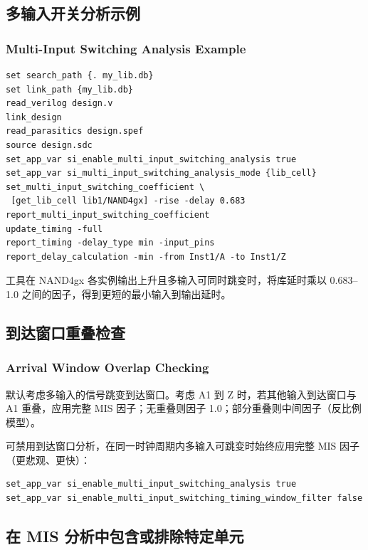 \subsection{多输入开关分析示例}
\subsubsection*{Multi-Input Switching Analysis Example}

\begin{lstlisting}
set search_path {. my_lib.db}
set link_path {my_lib.db}
read_verilog design.v
link_design
read_parasitics design.spef
source design.sdc
set_app_var si_enable_multi_input_switching_analysis true
set_app_var si_multi_input_switching_analysis_mode {lib_cell}
set_multi_input_switching_coefficient \
 [get_lib_cell lib1/NAND4gx] -rise -delay 0.683
report_multi_input_switching_coefficient
update_timing -full
report_timing -delay_type min -input_pins
report_delay_calculation -min -from Inst1/A -to Inst1/Z
\end{lstlisting}

工具在 NAND4gx 各实例输出上升且多输入可同时跳变时，将库延时乘以 0.683--1.0 之间的因子，得到更短的最小输入到输出延时。

\subsection{到达窗口重叠检查}
\subsubsection*{Arrival Window Overlap Checking}

默认考虑多输入的信号跳变到达窗口。考虑 A1 到 Z 时，若其他输入到达窗口与 A1 重叠，应用完整 MIS 因子；无重叠则因子 1.0；部分重叠则中间因子（反比例模型）。


可禁用到达窗口分析，在同一时钟周期内多输入可跳变时始终应用完整 MIS 因子（更悲观、更快）：
\begin{lstlisting}
set_app_var si_enable_multi_input_switching_analysis true
set_app_var si_enable_multi_input_switching_timing_window_filter false
\end{lstlisting}

\subsection{在 MIS 分析中包含或排除特定单元}
